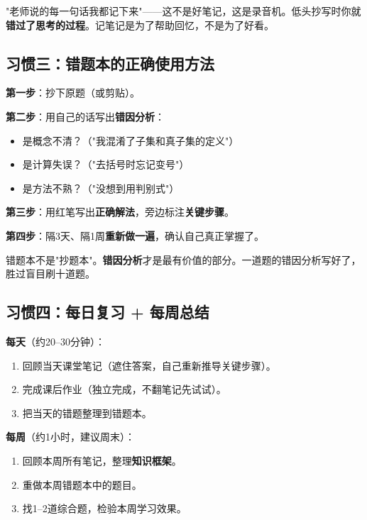 \documentclass[12pt, a4paper]{ctexart}
\begin{document}
\begin{warnbox}[常见误区]
"老师说的每一句话我都记下来"——这不是好笔记，这是录音机。低头抄写时你就\textbf{错过了思考的过程}。记笔记是为了帮助回忆，不是为了好看。
\end{warnbox}

\subsection*{习惯三：错题本的正确使用方法}

\begin{knowledgebox}[错题本使用指南]
\textbf{第一步}：抄下原题（或剪贴）。

\textbf{第二步}：用自己的话写出\textbf{错因分析}：
\begin{itemize}[leftmargin=2em]
  \item 是概念不清？（"我混淆了子集和真子集的定义"）
  \item 是计算失误？（"去括号时忘记变号"）
  \item 是方法不熟？（"没想到用判别式"）
\end{itemize}

\textbf{第三步}：用红笔写出\textbf{正确解法}，旁边标注\textbf{关键步骤}。

\textbf{第四步}：隔3天、隔1周\textbf{重新做一遍}，确认自己真正掌握了。
\end{knowledgebox}

\begin{tipbox}[错题本的灵魂]
错题本不是"抄题本"。\textbf{错因分析}才是最有价值的部分。一道题的错因分析写好了，胜过盲目刷十道题。
\end{tipbox}

\subsection*{习惯四：每日复习 + 每周总结}

\begin{knowledgebox}[复习计划模板]
\textbf{每天}（约20--30分钟）：
\begin{enumerate}[leftmargin=2.5em]
  \item 回顾当天课堂笔记（遮住答案，自己重新推导关键步骤）。
  \item 完成课后作业（独立完成，不翻笔记先试试）。
  \item 把当天的错题整理到错题本。
\end{enumerate}

\textbf{每周}（约1小时，建议周末）：
\begin{enumerate}[leftmargin=2.5em]
  \item 回顾本周所有笔记，整理\textbf{知识框架}。
  \item 重做本周错题本中的题目。
  \item 找1--2道综合题，检验本周学习效果。
\end{enumerate}
\end{knowledgebox}
\end{document}
